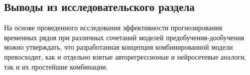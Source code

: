 \subsection{Выводы из исследовательского раздела}

\par На основе проведенного исследования эффективности прогнозирования временных рядов при различных сочетаний моделей предобучения-дообучения можно утверждать, что разработанная концепция комбинированной модели \\ 
превосходит, как и отдельно взятые авторегрессионые и нейросетевые аналоги, так и их простейшие комбинации.


\pagebreak